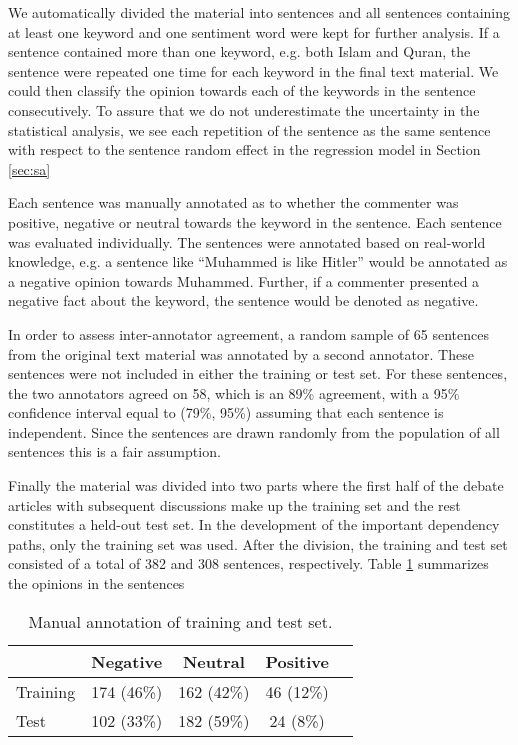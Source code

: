 \documentclass[11pt]{article}
\begin{document}
We automatically divided the material into sentences and all sentences containing at least one keyword and one sentiment word were kept for further analysis. If a sentence contained more than one keyword, e.g. both Islam and Quran, the sentence were repeated one time for each keyword in the final text material. We could then classify the opinion towards each of the keywords in the sentence consecutively. To assure that we do not underestimate the uncertainty in the statistical analysis, we see each repetition of the sentence as the same sentence with respect to the sentence random effect in the regression model in Section \ref{sec:sa}

Each sentence was manually annotated as to whether the commenter was positive, negative or neutral towards the keyword in the sentence. Each sentence was evaluated individually. The sentences were annotated based on real-world knowledge, e.g. a sentence like ``Muhammed is like Hitler'' would be annotated as a negative opinion towards Muhammed. Further, if a commenter presented a negative fact about the keyword, the sentence would be denoted as negative.

In order to assess inter-annotator agreement, a random sample of 65 sentences from the original text material was annotated by a second annotator. These sentences were not included in either the training or test set. For these sentences, the two annotators agreed on 58, which is an 89\% agreement, with a 95\% confidence interval equal to (79\%, 95\%) assuming that each sentence is independent. Since the sentences are drawn randomly from the population of all sentences this is a fair assumption.

Finally the material was divided into two parts where the first half of the debate articles with subsequent discussions make up the training set and the rest constitutes a held-out test set. In the development of the important dependency paths, only the training set was used. After the division, the training and test set consisted of a total of 382 and 308 sentences, respectively. Table \ref{tab:1} summarizes the opinions in the sentences
\begin{table}
  \caption{Manual annotation of training and test set.}
  \centering
  \begin{tabular}{lcccc}
             & Negative & Neutral & Positive \\\hline
    Training & 174 (46\%) & 162 (42\%) & 46 (12\%)\\
    Test     & 102 (33\%)& 182 (59\%) & 24 (8\%)
  \end{tabular}
  \label{tab:1}
\end{table}
\end{document}
